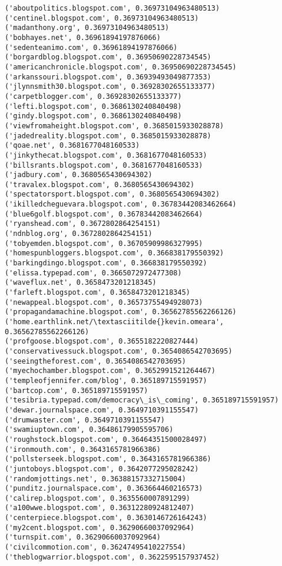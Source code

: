\documentclass[11pt]{article}
\begin{document}
\begin{Verbatim}[commandchars=\\\{\}]
('aboutpolitics.blogspot.com', 0.36973104963480513)
('centinel.blogspot.com', 0.36973104963480513)
('madanthony.org', 0.36973104963480513)
('bobhayes.net', 0.36961894197876066)
('sedenteanimo.com', 0.36961894197876066)
('borgardblog.blogspot.com', 0.36950690228734545)
('americanchronicle.blogspot.com', 0.36950690228734545)
('arkanssouri.blogspot.com', 0.36939493049877353)
('jlynnsmith30.blogspot.com', 0.36928302655133377)
('carpetblogger.com', 0.36928302655133377)
('lefti.blogspot.com', 0.3686130240840498)
('gindy.blogspot.com', 0.3686130240840498)
('viewfromaheight.blogspot.com', 0.3685015933028878)
('jadedreality.blogspot.com', 0.3685015933028878)
('qoae.net', 0.3681677048160533)
('jinkythecat.blogspot.com', 0.3681677048160533)
('billsrants.blogspot.com', 0.3681677048160533)
('jadbury.com', 0.3680565430694302)
('travalex.blogspot.com', 0.3680565430694302)
('spectatorsport.blogspot.com', 0.3680565430694302)
('ikilledcheguevara.blogspot.com', 0.36783442083462664)
('blue6golf.blogspot.com', 0.36783442083462664)
('ryanshead.com', 0.3672802864254151)
('ndnblog.org', 0.3672802864254151)
('tobyemden.blogspot.com', 0.36705909986327995)
('homespunbloggers.blogspot.com', 0.366838179550392)
('barkingdingo.blogspot.com', 0.366838179550392)
('elissa.typepad.com', 0.3665072972477308)
('waveflux.net', 0.3658473201218345)
('farleft.blogspot.com', 0.3658473201218345)
('newappeal.blogspot.com', 0.36573755494928073)
('propagandamachine.blogspot.com', 0.36562785562266126)
('home.earthlink.net/\textasciitilde{}kevin.omeara', 0.36562785562266126)
('profgoose.blogspot.com', 0.3655182220827444)
('conservativessuck.blogspot.com', 0.3654086542703695)
('seeingtheforest.com', 0.3654086542703695)
('myechochamber.blogspot.com', 0.3652991521264467)
('templeofjennifer.com/blog', 0.365189715591957)
('bartcop.com', 0.365189715591957)
('tesibria.typepad.com/democracy\_is\_coming', 0.365189715591957)
('dewar.journalspace.com', 0.3649710391155547)
('drumwaster.com', 0.3649710391155547)
('swamiuptown.com', 0.36486179905595706)
('roughstock.blogspot.com', 0.36464351500028497)
('ironmouth.com', 0.3643165781966386)
('pollsterseek.blogspot.com', 0.3643165781966386)
('juntoboys.blogspot.com', 0.3642077295028242)
('randomjottings.net', 0.36388157332715004)
('punditz.journalspace.com', 0.363664460216573)
('calirep.blogspot.com', 0.3635560007891299)
('a100wwe.blogspot.com', 0.36312280924812407)
('centerpiece.blogspot.com', 0.3630146726164243)
('my2cent.blogspot.com', 0.36290660037092964)
('turnspit.com', 0.36290660037092964)
('civilcommotion.com', 0.36247495410227554)
('theblogwarrior.blogspot.com', 0.3622595157937452)

\end{Verbatim}
\end{document}
